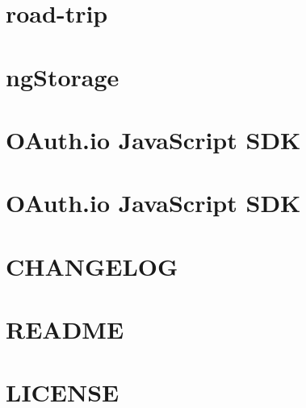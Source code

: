 \documentclass[twoside]{book}
\newcommand{\+}{\discretionary{\mbox{\scriptsize$\hookleftarrow$}}{}{}}
\begin{document}
\chapter{road-\/trip}
\label{md_app_web_bower_components_ngmap_road-trip}

\chapter{ng\+Storage}
\label{md_app_web_bower_components_ngstorage__r_e_a_d_m_e}

\chapter{O\+Auth.\+io Java\+Script S\+DK}
\label{md_app_web_bower_components_oauth-js__r_e_a_d_m_e}

\chapter{O\+Auth.\+io Java\+Script S\+DK}
\label{md_app_web_bower_components_oauth_8io__r_e_a_d_m_e}

\chapter{C\+H\+A\+N\+G\+E\+L\+OG}
\label{md_app_web_bower_components_oclazyload__c_h_a_n_g_e_l_o_g}

\chapter{R\+E\+A\+D\+ME}
\label{md_app_web_bower_components_oclazyload_examples_complex_example__r_e_a_d_m_e}

\chapter{L\+I\+C\+E\+N\+SE}
\label{md_app_web_bower_components_oclazyload__l_i_c_e_n_s_e}

\end{document}
